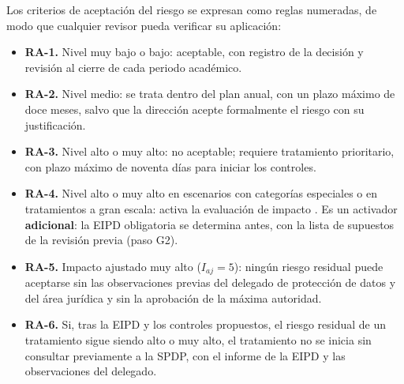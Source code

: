 Los criterios de aceptación del riesgo se expresan como reglas numeradas, de modo que cualquier revisor pueda verificar su aplicación:

\begin{itemize}
  \item \textbf{RA-1.} Nivel muy bajo o bajo: aceptable, con registro de la decisión y revisión al cierre de cada periodo académico.
  \item \textbf{RA-2.} Nivel medio: se trata dentro del plan anual, con un plazo máximo de doce meses, salvo que la dirección acepte formalmente el riesgo con su justificación.
  \item \textbf{RA-3.} Nivel alto o muy alto: no aceptable; requiere tratamiento prioritario, con plazo máximo de noventa días para iniciar los controles.
  \item \textbf{RA-4.} Nivel alto o muy alto en escenarios con categorías especiales o en tratamientos a gran escala: activa la evaluación de impacto \cite[art.~42]{lopdp2021}. Es un activador \textbf{adicional}: la EIPD obligatoria se determina antes, con la lista de supuestos de la revisión previa (paso G2).
  \item \textbf{RA-5.} Impacto ajustado muy alto ($I_{aj} = 5$): ningún riesgo residual puede aceptarse sin las observaciones previas del delegado de protección de datos y del área jurídica y sin la aprobación de la máxima autoridad.
  \item \textbf{RA-6.} Si, tras la EIPD y los controles propuestos, el riesgo residual de un tratamiento sigue siendo alto o muy alto, el tratamiento no se inicia sin consultar previamente a la SPDP, con el informe de la EIPD y las observaciones del delegado.
\end{itemize}

